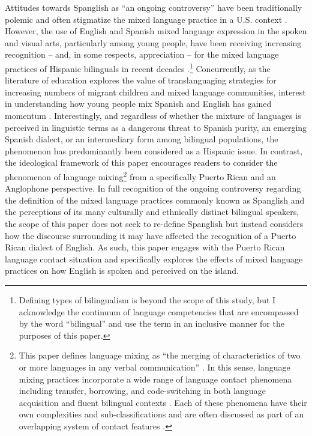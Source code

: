 \documentclass[output=paper,colorlinks,citecolor=brown]{langscibook}
\begin{document}
Attitudes towards Spanglish as “an ongoing controversy” have been traditionally polemic and often stigmatize the mixed language practice in a U.S. context \citep[136]{Dumitrescu_2010}. However, the use of English and Spanish mixed language expression in the spoken and visual arts, particularly among young people, have been receiving increasing recognition -- and, in some respects, appreciation -- for the mixed language practices of Hispanic bilinguals in recent decades \citep{Hernandez_1997,Stavans_2000,Pousada_2017}.\footnote{Defining types of bilingualism is beyond the scope of this study, but I acknowledge the continuum of language competencies that are encompassed by the word “bilingual” \citep[see][4--7]{Pousada_2017} and use the term in an inclusive manner for the purposes of this paper.} Concurrently, as the literature of education explores the value of translanguaging strategies for increasing numbers of migrant children and mixed language communities, interest in understanding how young people mix Spanish and English has gained momentum \citep{Sayer2008}. Interestingly, and regardless of whether the mixture of languages is perceived in linguistic terms as a dangerous threat to Spanish purity, an emerging Spanish dialect, or an intermediary form among bilingual populations, the phenomenon has predominantly been considered as a Hispanic issue. In contrast, the ideological framework of this paper encourages readers to consider the phenomenon of language mixing\footnote{This paper defines language mixing as “the merging of characteristics of two or more languages in any verbal communication” \citep[6]{Odlin_1989}. In this sense, language mixing practices incorporate a wide range of language contact phenomena including transfer, borrowing, and code-switching in both language acquisition and fluent bilingual contexts \citep{Muysken_2000}. Each of these phenomena have their own complexities and sub-classifications and are often discussed as part of an overlapping system of contact features \citep{Romaine_Kachru_1992,Yumoto_1995,Muysken_2000}.} from a specifically Puerto Rican and an Anglophone perspective. In full recognition of the ongoing controversy regarding the definition of the mixed language practices commonly known as Spanglish and the perceptions of its many culturally and ethnically distinct bilingual speakers, the scope of this paper does not seek to re-define Spanglish but instead considers how the discourse surrounding it may have affected the recognition of a Puerto Rican dialect of English. As such, this paper engages with the Puerto Rican language contact situation and specifically explores the effects of mixed language practices on how English is spoken and perceived on the island. 
\end{document}
